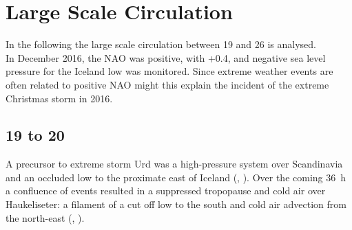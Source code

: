 \section{Large Scale Circulation} \label{sec:largeScale}
In the following the large scale circulation between \num{19} and \SI{26}{\dec} is analysed.
\\
In December 2016, the NAO was positive, with +\num{0.4}, and negative sea level pressure for the Iceland low \citep{shi_climate_2016} was monitored. Since extreme weather events are often related to positive NAO might this explain the incident of the extreme Christmas storm in 2016. 

\subsection*{\num{19} to \SI{20}{\dec}}
A precursor to extreme storm Urd was a high-pressure system over Scandinavia  and an occluded low to the proximate east of Iceland (, ). Over the coming \SI{36}{\hour} a confluence of events resulted in a suppressed tropopause and cold air over Haukeliseter: a filament of a cut off low to the south and cold air advection from the north-east (, ).
